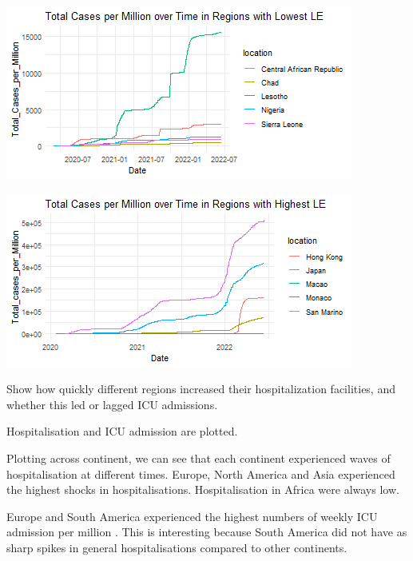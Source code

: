 \documentclass[11pt,preprint, authoryear]{elsarticle}
\let\origfigure\figure
\let\endorigfigure\endfigure
\renewenvironment{figure}[1][2] {
    \expandafter\origfigure\expandafter[H]
} {
    \endorigfigure
}
\numberwithin{equation}{section}
\numberwithin{figure}{section}
\numberwithin{table}{section}
\begin{document}
\begin{figure}[H]

{\centering \includegraphics{Q1_files/figure-latex/Figure2-3} 

}

\caption{Caption Here \label{Figure2}}\label{fig:Figure2-3}
\end{figure}
\begin{figure}[H]

{\centering \includegraphics{Q1_files/figure-latex/Figure2-4} 

}

\caption{Caption Here \label{Figure2}}\label{fig:Figure2-4}
\end{figure}

Show how quickly different regions increased their hospitalization
facilities, and whether this led or lagged ICU admissions.

Hospitalisation and ICU admission are plotted.

Plotting across continent, we can see that each continent experienced
waves of hospitalisation at different times. Europe, North America and
Asia experienced the highest shocks in hospitalisations. Hospitalisation
in Africa were always low.

Europe and South America experienced the highest numbers of weekly ICU
admission per million . This is interesting because South America did
not have as sharp spikes in general hospitalisations compared to other
continents.
\end{document}
